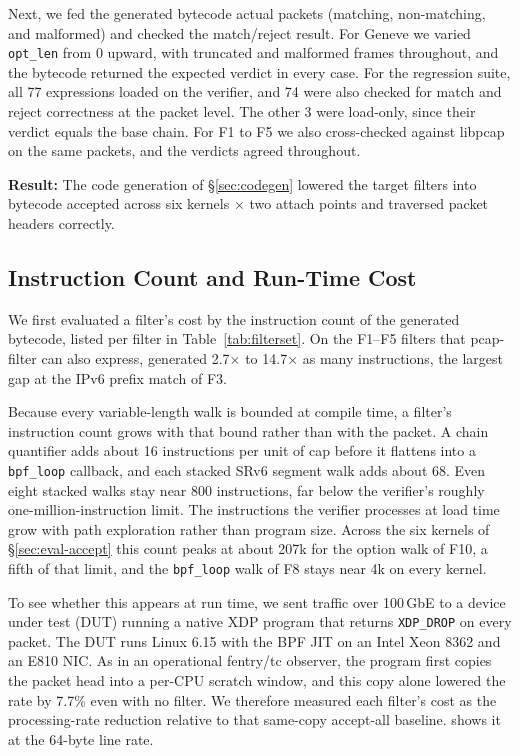 Next, we fed the generated bytecode actual packets (matching,
non-matching, and malformed) and checked the match/reject result. For
Geneve we varied \texttt{opt\_len} from 0 upward, with truncated and
malformed frames throughout, and the bytecode returned the expected
verdict in every case. For the regression suite, all 77
expressions loaded on the verifier, and 74 were also checked for
match and reject correctness at the packet level. The other 3 were
load-only, since their verdict equals the base chain. For F1 to F5 we
also cross-checked \kunai against libpcap on the same packets, and the
verdicts agreed throughout.

\textbf{Result:} The code generation of \S\ref{sec:codegen} lowered
the target filters into bytecode accepted across six kernels
$\times$ two attach points and traversed packet headers correctly.

\subsection{Instruction Count and Run-Time Cost}
\label{sec:eval-cost}

We first evaluated a filter's cost by the instruction count of the
generated bytecode, listed per filter in Table~\ref{tab:filterset}. On
the F1--F5 filters that pcap-filter can also express, \kunai generated
2.7$\times$ to 14.7$\times$ as many instructions, the largest gap at
the IPv6 prefix match of F3.

Because every variable-length walk is bounded at compile time, a
filter's instruction count grows with that bound rather than with the
packet. A chain quantifier adds about 16 instructions per unit of cap
before it flattens into a \texttt{bpf\_loop} callback, and each stacked
SRv6 segment walk adds about 68. Even eight stacked walks stay near 800
instructions, far below the verifier's roughly one-million-instruction
limit. The instructions the verifier processes at load time grow with
path exploration rather than program size. Across the six kernels of
\S\ref{sec:eval-accept} this count peaks at about 207k for the option
walk of F10, a fifth of that limit, and the \texttt{bpf\_loop} walk of
F8 stays near 4k on every kernel.

To see whether this appears at run time, we sent traffic over
100\,GbE to a device under test (DUT) running a native XDP program
that returns \texttt{XDP\_DROP} on every packet. The DUT runs Linux
6.15 with the BPF JIT on an Intel Xeon 8362 and an E810 NIC. As in an operational fentry/tc observer, the program first copies
the packet head into a per-CPU scratch window, and this copy alone
lowered the rate by 7.7\% even with no filter. We therefore measured
each filter's cost as the processing-rate reduction relative to that
same-copy accept-all baseline.  shows it at the
64-byte line rate.

